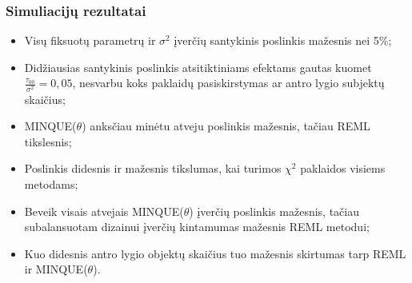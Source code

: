 \documentclass[utf8,hyperref={unicode,pdftex}]{beamer}
\begin{document}
\begin{frame}
\frametitle{Simuliacijų rezultatai}

\begin{itemize}
\item Visų fiksuotų parametrų ir $\sigma^2$ įverčių santykinis poslinkis mažesnis nei 5\%;
\item Didžiausias santykinis poslinkis atsitiktiniams efektams gautas kuomet $\frac{\tau_{00}}{\sigma^2}=0,05$, nesvarbu koks paklaidų pasiskirstymas ar antro lygio subjektų skaičius;
\item MINQUE($\theta$) anksčiau minėtu atveju poslinkis mažesnis, tačiau REML tikslesnis;
\item Poslinkis didesnis ir mažesnis tikslumas, kai turimos $\chi^2$ paklaidos visiems metodams;
\item Beveik visais atvejais MINQUE($\theta$) įverčių poslinkis mažesnis, tačiau subalansuotam dizainui įverčių kintamumas mažesnis REML metodui;
\item Kuo didesnis antro lygio objektų skaičius tuo mažesnis skirtumas tarp REML ir MINQUE($\theta$).

\end{itemize}

\end{frame}
\end{document}
